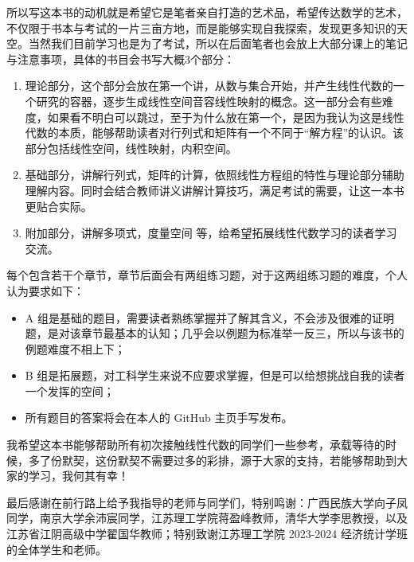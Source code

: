 所以写这本书的动机就是希望它是笔者亲自打造的艺术品，希望传达数学的艺术，不仅限于书本与考试的一片三亩方地，而是能够实现自我探索，发现更多知识的天空。当然我们目前学习也是为了考试，所以在后面笔者也会放上大部分课上的笔记与注意事项，具体的书目会书写大概3个部分：

\vspace{1em}

\begin{enumerate}
	\item 理论部分，这个部分会放在第一个讲，从数与集合开始，并产生线性代数的一个研究的容器，逐步生成线性空间音容线性映射的概念。这一部分会有些难度，如果看不明白可以跳过，至于为什么放在第一个，是因为我认为这是线性代数的本质，能够帮助读者对行列式和矩阵有一个不同于``解方程''的认识。该部分包括线性空间，线性映射，内积空间。
	\item 基础部分，讲解行列式，矩阵的计算，依照线性方程组的特性与理论部分辅助理解内容。同时会结合教师讲义讲解计算技巧，满足考试的需要，让这一本书更贴合实际。
	\item 附加部分，讲解多项式，度量空间
    等，给希望拓展线性代数学习的读者学习交流。
\end{enumerate}

\vspace{1em}

每个包含若干个章节，章节后面会有两组练习题，对于这两组练习题的难度，个人认为要求如下：

\vspace{1em}

\begin{itemize}
	\item A 组是基础的题目，需要读者熟练掌握并了解其含义，不会涉及很难的证明题，是对该章节最基本的认知；几乎会以例题为标准举一反三，所以与该书的例题难度不相上下；
	\item B 组是拓展题，对工科学生来说不应要求掌握，但是可以给想挑战自我的读者一个发挥的空间；
	\item 所有题目的答案将会在本人的 GitHub 主页手写发布。
\end{itemize}

\vspace{1em}

我希望这本书能够帮助所有初次接触线性代数的同学们一些参考，承载等待的时候，多了份默契，这份默契不需要过多的彩排，源于大家的支持，若能够帮助到大家的学习，我何其有幸！

最后感谢在前行路上给予我指导的老师与同学们，特别鸣谢：广西民族大学向子凤同学，南京大学余沛宸同学，江苏理工学院蒋盈峰教师，清华大学李思教授，以及江苏省江阴高级中学翟国华教师；特别致谢江苏理工学院 2023-2024 经济统计学班的全体学生和老师。 


